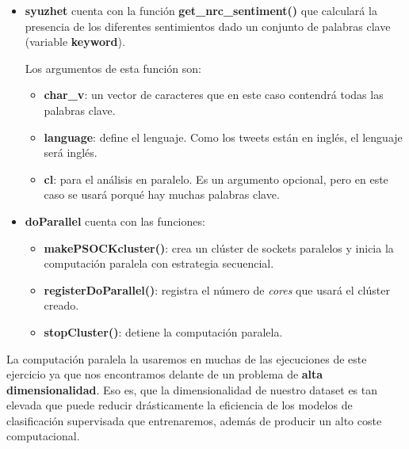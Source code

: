 \documentclass[]{article}
\providecommand{\tightlist}{%
  \setlength{\itemsep}{0pt}\setlength{\parskip}{0pt}}
\begin{document}
\begin{itemize}
\tightlist
\item
  \textbf{syuzhet} cuenta con la función
  \textbf{get\_nrc\_sentiment()} que calculará la presencia de los
  diferentes sentimientos dado un conjunto de palabras clave (variable \textbf{keyword}). 
  
  Los argumentos de esta función son:
  
  \vspace{2mm}

  \begin{itemize}
  \tightlist
  \item
    \textbf{char\_v}: un vector de caracteres que en este caso contendrá
    todas las palabras clave.
  \item
    \textbf{language}: define el lenguaje. Como los tweets están en
    inglés, el lenguaje será inglés.
  \item
    \textbf{cl}: para el análisis en paralelo. Es un argumento opcional, pero en este
    caso se usará porqué hay muchas palabras clave.
  \end{itemize}

\vspace{3mm}

\item
  \textbf{doParallel} cuenta con las funciones:
  
  \vspace{2mm}

  \begin{itemize}
  \tightlist
  \item
    \textbf{makePSOCKcluster()}: crea un clúster de sockets paralelos y inicia la computación paralela con estrategia secuencial.
  \item
    \textbf{registerDoParallel()}: registra el número de \emph{cores} que
    usará el clúster creado.
  \item
    \textbf{stopCluster()}: detiene la computación paralela.
  \end{itemize}
\end{itemize}

La computación paralela la usaremos en muchas de las ejecuciones de este ejercicio ya que nos encontramos delante de un problema de \textbf{alta dimensionalidad}. Eso es, que la dimensionalidad de nuestro dataset es tan elevada que puede reducir drásticamente la eficiencia de los modelos de clasificación supervisada que entrenaremos, además de producir un alto coste computacional.
\end{document}
